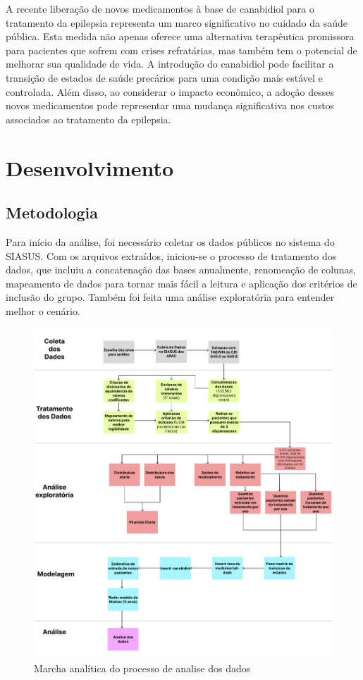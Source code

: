 \documentclass[article,a4paper,12pt,brazil,sumario=tradicional]{abntex2}
\begin{document}
A recente liberação de novos medicamentos à base de canabidiol para o tratamento da epilepsia representa um marco significativo no cuidado da saúde pública. Esta medida não apenas oferece uma alternativa terapêutica promissora para pacientes que sofrem com crises refratárias, mas também tem o potencial de melhorar sua qualidade de vida. A introdução do canabidiol pode facilitar a transição de estados de saúde precários para uma condição mais estável e controlada. Além disso, ao considerar o impacto econômico, a adoção desses novos medicamentos pode representar uma mudança significativa nos custos associados ao tratamento da epilepsia.

\section{Desenvolvimento}

\subsection{Metodologia}

Para início da análise, foi necessário coletar os dados públicos no sistema do SIASUS. Com os arquivos extraídos, iniciou-se o processo de tratamento dos dados, que incluiu a concatenação das bases anualmente, renomeação de colunas, mapeamento de dados para tornar mais fácil a leitura e aplicação dos critérios de inclusão do grupo. Também foi feita uma análise exploratória para entender melhor o cenário.

\begin{figure}[!ht]
    \centering
    \includegraphics[width=1\textwidth]{marcha_analitica.png}
    \caption{Marcha analítica do processo de analise dos dados}
    \label{fig:marcha_analitica}
\end{figure}
\end{document}
